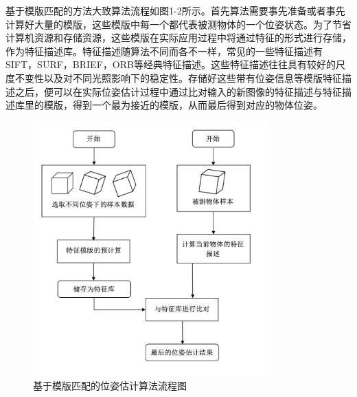 基于模版匹配的方法大致算法流程如图1-2所示。首先算法需要事先准备或者事先计算好大量的模版，这些模版中每一个都代表被测物体的一个位姿状态。为了节省计算机资源和存储资源，这些模版在实际应用过程中将通过特征的形式进行存储，作为特征描述库。特征描述随算法不同而各不一样，常见的一些特征描述有SIFT\cite{lowe1999object}，SURF\cite{bay2006surf}，BRIEF\cite{calonder2010brief}，ORB\cite{rublee2011orb}等经典特征描述。这些特征描述往往具有较好的尺度不变性以及对不同光照影响下的稳定性。存储好这些带有位姿信息等模版特征描述之后，便可以在实际位姿估计过程中通过比对输入的新图像的特征描述与特征描述库里的模版，得到一个最为接近的模版，从而最后得到对应的物体位姿。
\begin{figure}[htb]
	\centering 
	\includegraphics[width=0.8\textwidth]{./mypic/基于模版匹配的位姿估计算法流程图.jpg} 
	\caption{基于模版匹配的位姿估计算法流程图} 
\end{figure}

